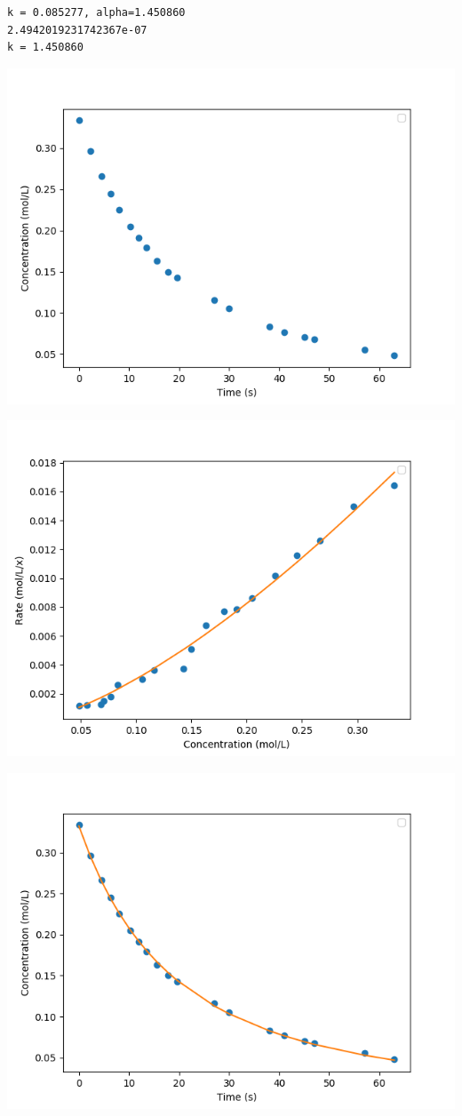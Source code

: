\documentclass[11pt]{article}
\begin{document}
\begin{verbatim}
k = 0.085277, alpha=1.450860
2.4942019231742367e-07
k = 1.450860
\end{verbatim}



\begin{center}
\includegraphics[width=.9\linewidth]{./xylene-conc.png}
\end{center}
\begin{center}
\includegraphics[width=.9\linewidth]{./xylene-rate.png}
\end{center}
\begin{center}
\includegraphics[width=.9\linewidth]{./xylene-int-model.png}
\end{center}
\end{document}
